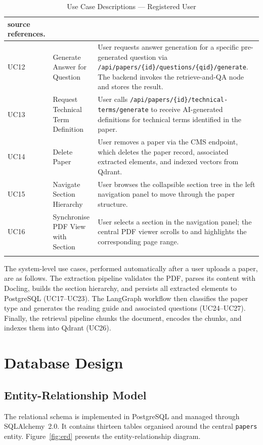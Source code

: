 \documentclass[12pt,a4paper]{report}
\begin{document}
\begin{longtable}{|p{1.2cm}|p{3.5cm}|p{9.3cm}|}
source references. \\
\hline
UC12 & Generate Answer for Question & User requests answer generation for a
specific pre-generated question via
\texttt{/api/papers/\{id\}/questions/\{qid\}/generate}. The backend invokes
the retrieve-and-QA node and stores the result. \\
\hline
UC13 & Request Technical Term Definition & User calls
\texttt{/api/papers/\{id\}/technical-terms/generate} to receive AI-generated
definitions for technical terms identified in the paper. \\
\hline
UC14 & Delete Paper & User removes a paper via the CMS endpoint, which deletes
the paper record, associated extracted elements, and indexed vectors from
Qdrant. \\
\hline
UC15 & Navigate Section Hierarchy & User browses the collapsible section tree
in the left navigation panel to move through the paper structure. \\
\hline
UC16 & Synchronise PDF View with Section & User selects a section in the
navigation panel; the central PDF viewer scrolls to and highlights the
corresponding page range. \\
\hline
\caption{Use Case Descriptions — Registered User}
\label{tab:usecases}
\end{longtable}

The system-level use cases, performed automatically after a user uploads a
paper, are as follows. The extraction pipeline validates the PDF, parses its
content with Docling, builds the section hierarchy, and persists all extracted
elements to PostgreSQL (UC17--UC23). The LangGraph workflow then classifies
the paper type and generates the reading guide and associated questions
(UC24--UC27). Finally, the retrieval pipeline chunks the document, encodes
the chunks, and indexes them into Qdrant (UC26).

\section{Database Design}

\subsection{Entity-Relationship Model}

The relational schema is implemented in PostgreSQL and managed through
SQLAlchemy~2.0. It contains thirteen tables organised around the central
\texttt{papers} entity. Figure~\ref{fig:erd} presents the entity-relationship
diagram.
\end{document}
